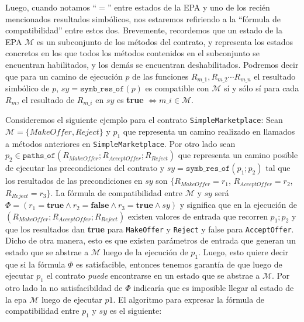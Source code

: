Luego, cuando notamos ``$=$'' entre estados de la EPA y uno de los recién mencionados resultados simbólicos, nos estaremos refiriendo a la ``fórmula de compatibilidad'' entre estos dos.
Brevemente, recordemos que un estado de la EPA $\mathcal{M}$ es un subconjunto de los métodos del contrato, y representa los estados concretos en los que todos los métodos contenidos en el subconjunto se encuentran habilitados, y los demás se encuentran deshabilitados.
Podremos decir que para un camino de ejecución $p$ de las funciones $R_{m\_1},R_{m\_2} \cdots R_{m\_n}$ el resultado simbólico de $p$, $sy = \texttt{symb\_res\_of}(p)$ es compatible con $\mathcal{M}$ sí y sólo sí para cada $R_m$, el resultado de $R_{m\_i}$ en $sy$ es \textbf{true} $\iff m\_i \in \mathcal{M}$.

Consideremos el siguiente ejemplo para el contrato \texttt{SimpleMarketplace}:
Sean $\mathcal{M} = \{MakeOffer, Reject\}$ y $p_1$ que representa un camino realizado en llamados a métodos anteriores en \texttt{SimpleMarketplace}.
Por otro lado sean $p_2 \in \texttt{paths\_of}(R_{MakeOffer}; R_{AcceptOffer}; R_{Reject})$ que representa un camino posible de ejecutar las precondiciones del contrato y $sy = \texttt{symb\_res\_of}(p_1;p_2)$ tal que los resultados de las precondiciones en $sy$ son $\{R_{MakeOffer} = r_1$, $R_{AcceptOffer} = r_2$, $R_{Reject} = r_3\}$.
La fórmula de compatibilidad entre $\mathcal{M}$ y $sy$ será $\Phi = (r_1 = \textbf{true} \land r_2 = \textbf{false} \land r_3 = \textbf{true} \land sy)$ y significa que en la ejecución de $(R_{MakeOffer}; R_{AcceptOffer}; R_{Reject})$ existen valores de entrada que recorren $p_1;p_2$ y que los resultados dan \textbf{true} para \texttt{MakeOffer} y \texttt{Reject} y false para \texttt{AcceptOffer}.
Dicho de otra manera, esto es que existen parámetros de entrada que generan un estado que se abstrae a $\mathcal{M}$ luego de la ejecución de $p_1$.
Luego, esto quiere decir que si la fórmula $\Phi$ es satisfacible, entonces tenemos garantía de que luego de ejecutar $p_1$ el contrato \textit{puede} encontrarse en un estado que se abstrae a $\mathcal{M}$.
Por otro lado la no satisfacibildad de $\Phi$ indicaría que es imposible llegar al estado de la epa $\mathcal{M}$ luego de ejecutar $p1$.
El algoritmo para expresar la fórmula de compatibilidad entre $p_1$ y $sy$ es el siguiente:

